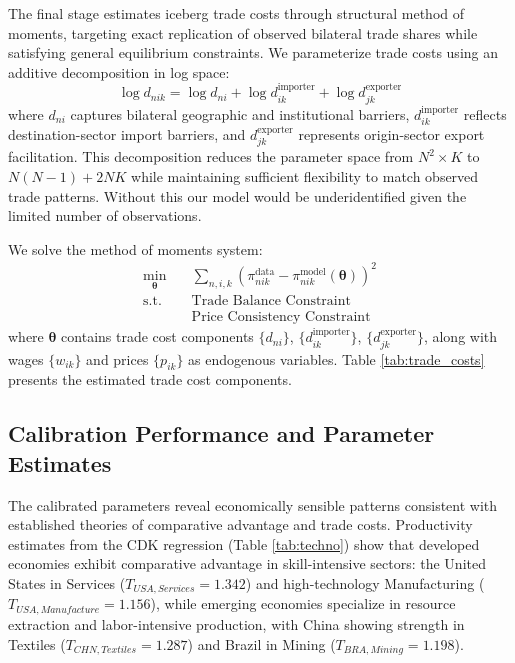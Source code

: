 The final stage estimates iceberg trade costs through structural method of moments, targeting exact replication of observed bilateral trade shares while satisfying general equilibrium constraints. We parameterize trade costs using an additive decomposition in log space:
\begin{equation}
\log d_{nik} = \log d_{ni} + \log d_{ik}^{\text{importer}} + \log d_{jk}^{\text{exporter}}
\end{equation}
where $d_{ni}$ captures bilateral geographic and institutional barriers, $d_{ik}^{\text{importer}}$ reflects destination-sector import barriers, and $d_{jk}^{\text{exporter}}$ represents origin-sector export facilitation. This decomposition reduces the parameter space from $N^2 \times K$ to $N(N-1) + 2NK$ while maintaining sufficient flexibility to match observed trade patterns. Without this our model would be underidentified given the limited number of observations.

We solve the method of moments system:
\begin{align*}
\min_{\boldsymbol{\theta}} &\quad \sum_{n,i,k} \left( \pi_{nik}^{\text{data}} - \pi_{nik}^{\text{model}}(\boldsymbol{\theta}) \right)^2 \\
\text{s.t.} & \quad \text{Trade Balance Constraint} \\
& \quad \text{Price Consistency Constraint}
\end{align*}
where $\boldsymbol{\theta}$ contains trade cost components $\{d_{ni}\}$, $\{d_{ik}^{\text{importer}}\}$, $\{d_{jk}^{\text{exporter}}\}$, along with wages $\{w_{ik}\}$ and prices $\{p_{ik}\}$ as endogenous variables. Table \ref{tab:trade_costs} presents the estimated trade cost components.

\subsection{Calibration Performance and Parameter Estimates}

The calibrated parameters reveal economically sensible patterns consistent with established theories of comparative advantage and trade costs. Productivity estimates from the CDK regression (Table \ref{tab:techno}) show that developed economies exhibit comparative advantage in skill-intensive sectors: the United States in Services ($T_{USA,Services} = 1.342$) and high-technology Manufacturing ($T_{USA,Manufacture} = 1.156$), while emerging economies specialize in resource extraction and labor-intensive production, with China showing strength in Textiles ($T_{CHN,Textiles} = 1.287$) and Brazil in Mining ($T_{BRA,Mining} = 1.198$).

